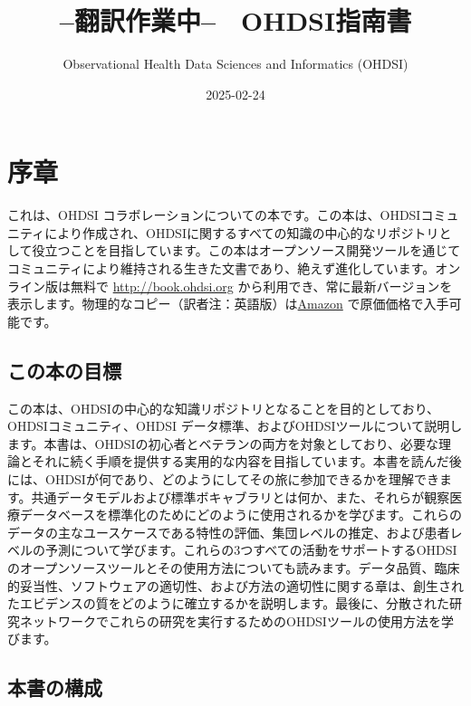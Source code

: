 \documentclass[
  11pt]{book}
\title{--翻訳作業中--　OHDSI指南書}
\author{Observational Health Data Sciences and Informatics (OHDSI)}
\date{2025-02-24}
\theoremstyle{definition}
\theoremstyle{definition}
\theoremstyle{definition}
\theoremstyle{definition}
\theoremstyle{remark}
\begin{document}
\maketitle

{
\setcounter{tocdepth}{1}
\tableofcontents
}
\chapter*{序章}\label{ux5e8fux7ae0}

これは、OHDSI コラボレーションについての本です。この本は、OHDSIコミュニティにより作成され、OHDSIに関するすべての知識の中心的なリポジトリとして役立つことを目指しています。この本はオープンソース開発ツールを通じてコミュニティにより維持される生きた文書であり、絶えず進化しています。オンライン版は無料で \url{http://book.ohdsi.org} から利用でき、常に最新バージョンを表示します。物理的なコピー（訳者注：英語版）は\href{https://www.amazon.com/OHDSI-Observational-Health-Sciences-Informatics/dp/1088855199}{Amazon} で原価価格で入手可能です。

\section*{この本の目標}\label{ux3053ux306eux672cux306eux76eeux6a19}

この本は、OHDSIの中心的な知識リポジトリとなることを目的としており、OHDSIコミュニティ、OHDSI データ標準、およびOHDSIツールについて説明します。本書は、OHDSIの初心者とベテランの両方を対象としており、必要な理論とそれに続く手順を提供する実用的な内容を目指しています。本書を読んだ後には、OHDSIが何であり、どのようにしてその旅に参加できるかを理解できます。共通データモデルおよび標準ボキャブラリとは何か、また、それらが観察医療データベースを標準化のためにどのように使用されるかを学びます。これらのデータの主なユースケースである特性の評価、集団レベルの推定、および患者レベルの予測について学びます。これらの3つすべての活動をサポートするOHDSIのオープンソースツールとその使用方法についても読みます。データ品質、臨床的妥当性、ソフトウェアの適切性、および方法の適切性に関する章は、創生されたエビデンスの質をどのように確立するかを説明します。最後に、分散された研究ネットワークでこれらの研究を実行するためのOHDSIツールの使用方法を学びます。

\section*{本書の構成}\label{ux672cux66f8ux306eux69cbux6210}
\end{document}
